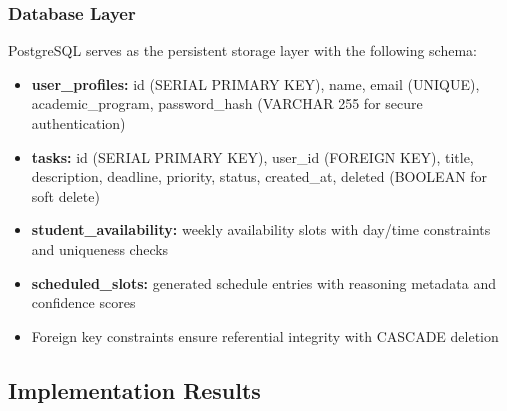 \documentclass[12pt]{article}
\begin{document}
\subsubsection{Database Layer}
PostgreSQL serves as the persistent storage layer with the following schema:
\begin{itemize}
    \item \textbf{user\_profiles:} id (SERIAL PRIMARY KEY), name, email (UNIQUE), academic\_program, password\_hash (VARCHAR 255 for secure authentication)
    \item \textbf{tasks:} id (SERIAL PRIMARY KEY), user\_id (FOREIGN KEY), title, description, deadline, priority, status, created\_at, deleted (BOOLEAN for soft delete)
    \item \textbf{student\_availability:} weekly availability slots with day/time constraints and uniqueness checks
    \item \textbf{scheduled\_slots:} generated schedule entries with reasoning metadata and confidence scores
    \item Foreign key constraints ensure referential integrity with CASCADE deletion
\end{itemize}

\subsection{Implementation Results}
\end{document}
